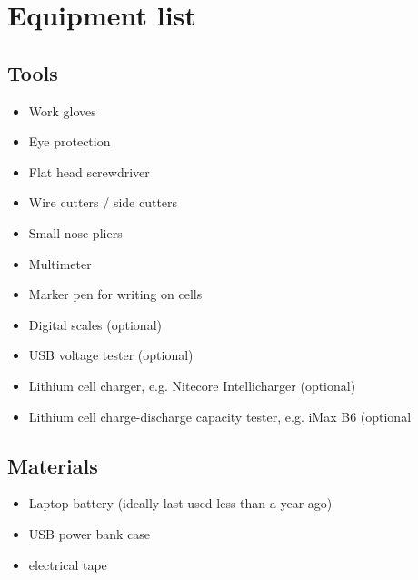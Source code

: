 \documentclass{article}
\theoremstyle{definition}
\theoremstyle{definition}
\theoremstyle{remark}
\begin{document}


\newpage

\appendix

\section{Equipment list} %
\label{sec:equipment_list}

  \subsection{Tools} %
  \label{sub:tools}

    \begin{itemize}
      \item Work gloves
      \item Eye protection
      \item Flat head screwdriver
      \item Wire cutters / side cutters
      \item Small-nose pliers
      \item Multimeter
      \item Marker pen for writing on cells
      \item Digital scales (optional)
      \item USB voltage tester (optional)
      \item Lithium cell charger, e.g. Nitecore Intellicharger (optional)
      \item Lithium cell charge-discharge capacity tester, e.g. iMax B6 (optional
    \end{itemize}
  

  \subsection{Materials} %
  \label{sub:materials}

    \begin{itemize}
      \item Laptop battery (ideally last used less than a year ago)
      \item USB power bank case
      \item electrical tape
    \end{itemize}
  
\end{document}
